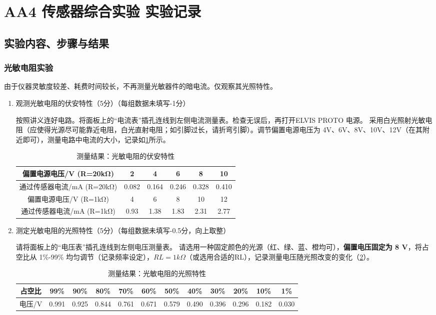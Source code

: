 \documentclass[dvipsnames, svgnames,a4paper,11pt]{article}
\begin{document}
	\section{AA4 传感器综合实验  \quad\heiti 实验记录}
	\subsection{实验内容、步骤与结果}
	\subsubsection{光敏电阻实验}
	由于仪器灵敏度较差、耗费时间较长，不再测量光敏器件的暗电流。仅观察其光照特性。
	\begin{enumerate}
		\item 观测光敏电阻的伏安特性（5分）（每组数据未填写-1分）
		
		按照讲义连好电路。将面板上的“电流表”插孔连线到左侧电流测量表。检查无误后，再打开ELVIS PROTO 电源。
		采用白光照射光敏电阻（应使得光源尽可能靠近电阻，白光直射电阻；如引脚过长，请折弯引脚）。调节偏置电源电压为 4V、6V、8V、10V、12V（在其附近即可），测量电路中电流的大小，记录如\cref{tab:tab1}所示。
		
		\begin{table}[h]
			\centering
			\caption{测量结果：光敏电阻的伏安特性}
			\label{tab:tab1}
			\begin{tabular}{|c|c|c|c|c|c|}
				\hline
				偏置电源电压/V (R=20kΩ) & 2 & 4 & 6 & 8 & 10 \\
				\hline
				通过传感器电流/mA (R=20kΩ) & 0.082 & 0.164 & 0.246 & 0.328 & 0.410 \\
				\hline
				偏置电源电压/V (R=1kΩ) & 4 & 6 & 8 & 10 & 12 \\
				\hline
				通过传感器电流/mA (R=1kΩ) & 0.93 & 1.38 & 1.83 & 2.31 & 2.77 \\
				\hline
			\end{tabular}
		\end{table}
		
		
		\item 测定光敏电阻的光照特性（5分）（每组数据未填写-0.5分，向上取整）
		
		请将面板上的“电压表”插孔连线到左侧电压测量表。
		请选用一种固定颜色的光源（红、绿、蓝、橙均可），\textbf{偏置电压固定为 8 V}，将占空比从 1\%-99\% 均匀调节（记录频率设定），\textbf{$RL=1k\Omega$}（或选用合适的RL），记录测量电压随光照改变的变化（\cref{tab:tab2}）。
		
		\begin{table}[h]
			\centering
			\caption{测量结果：光敏电阻的光照特性}
			\label{tab:tab2}
				\begin{tabular}{|*{12}{c|}}
					\hline
					占空比 & 99\% & 90\% & 80\% & 70\% & 60\% & 50\% & 40\% & 30\% & 20\% & 10\% & 1\% \\
					\hline
					电压/V & 0.991 & 0.925 & 0.844 & 0.761 & 0.671 & 0.579 & 0.490 & 0.396 & 0.296 & 0.182 & 0.030 \\
					\hline					
				\end{tabular}
		\end{table}
		

\end{enumerate}
\end{document}
